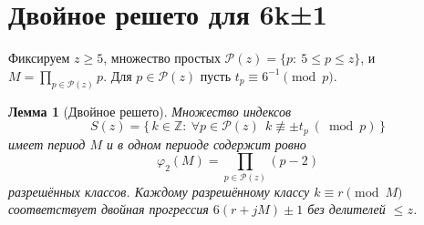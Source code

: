\documentclass[11pt,a4paper]{article}
\newtheorem{lemma}[definition]{Лемма}
\newcommand{\Z}{\mathbb{Z}}
\begin{document}
\section{Двойное решето для 6k±1}
Фиксируем $z\ge5$, множество простых $\mathcal P(z)=\{p:\ 5\le p\le z\}$, и $M=\prod_{p\in\mathcal P(z)}p$. Для $p\in\mathcal P(z)$ пусть $t_p\equiv 6^{-1}\pmod p$.

\begin{lemma}[Двойное решето]\label{lem:double}
Множество индексов
\begin{equation*}
S(z)=\bigl\{\,k\in\Z:\ \forall p\in\mathcal P(z)\ \ k\not\equiv \pm t_p\ (\bmod p)\,\bigr\}
\end{equation*}
имеет период $M$ и в одном периоде содержит ровно
\begin{equation*}
\varphi_2(M)=\prod_{p\in\mathcal P(z)}(p-2)
\end{equation*}
разрешённых классов. Каждому разрешённому классу $k\equiv r\pmod M$ соответствует \emph{двойная} прогрессия $6(r+jM)\pm1$ без делителей $\le z$.
\end{lemma}
\end{document}
